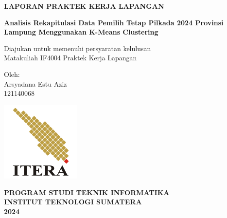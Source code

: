 \begin{titlepage}
    \begin{center}
        \vspace*{1cm}
        
        \Large
        \textbf{LAPORAN PRAKTEK KERJA LAPANGAN}
        
        \vspace{0.5cm}
        \Large
        \textbf{Analisis Rekapitulasi Data Pemilih Tetap Pilkada 2024 Provinsi Lampung Menggunakan K-Means Clustering}
        
        \vspace{1cm}
        
        Diajukan untuk memenuhi persyaratan kelulusan \\
        Matakuliah IF4004 Praktek Kerja Lapangan
        
        \vspace{1cm}
        
        Oleh: \\
        Arsyadana Estu Aziz \\
        121140068
        
        \vspace{1cm}
        
        \includegraphics[width=0.3\textwidth]{images/itera_logo.png} 
        
        \vspace{1.5cm}
        
        \textbf{PROGRAM STUDI TEKNIK INFORMATIKA} \\
        \textbf{INSTITUT TEKNOLOGI SUMATERA} \\
        \textbf{2024}
        
    \end{center}
\end{titlepage}
